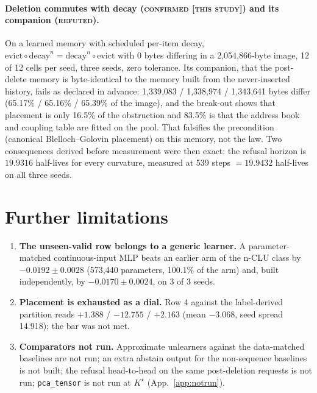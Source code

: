 \documentclass{article} %
\newcommand{\Kstar}{\ensuremath{K^{\star}}}
\begin{document}
\paragraph{Deletion commutes with decay (\textsc{confirmed [this study]}) and its companion
(\textsc{refuted}).} On a learned memory with scheduled per-item decay,
$\text{evict}\circ\text{decay}^n=\text{decay}^n\circ\text{evict}$ with 0 bytes differing in a
2,054,866-byte image, 12 of 12 cells per seed, three seeds, zero tolerance.
Its companion, that the post-delete memory is byte-identical to the memory built from the
never-inserted history, fails as declared in advance: 1,339,083 / 1,338,974 / 1,343,641 bytes differ
(65.17\% / 65.16\% / 65.39\% of the image), and the break-out shows that placement is only 16.5\%
of the obstruction and 83.5\% is that the address book and coupling table are fitted on the pool.
That falsifies the precondition (canonical Blelloch--Golovin placement) on this memory, not the
law. Two consequences derived before measurement were then exact: the refusal horizon is $19.9316$
half-lives for every curvature, measured at 539 steps $=19.9432$ half-lives on all three seeds.


\section{Further limitations}
\label{app:morelimits}
\begin{enumerate}[leftmargin=*,itemsep=1pt]
\item \textbf{The unseen-valid row belongs to a generic learner.} A parameter-matched
  continuous-input MLP beats an earlier arm of the n-CLU class by $-0.0192\pm0.0028$ (573,440
  parameters, 100.1\% of the arm) and, built independently, by $-0.0170\pm0.0024$, on 3 of 3
  seeds. %
\item \textbf{Placement is exhausted as a dial.} Row 4 against the label-derived partition reads
  $+1.388$ / $-12.755$ / $+2.163$ (mean $-3.068$, seed spread 14.918); the bar was not met.
\item \textbf{Comparators not run.} Approximate unlearners against the data-matched baselines are not
  run; an extra abstain output for the non-sequence baselines is not built; the refusal head-to-head on
  the same post-deletion requests is not run; \texttt{pca\_tensor} is not run at $\Kstar$
  (App.~\ref{app:notrun}).
\end{enumerate}
\end{document}
